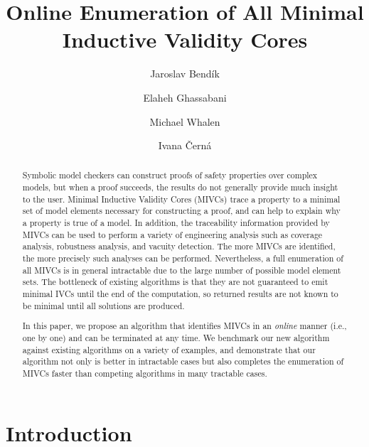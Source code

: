 \documentclass{llncs}
\begin{document}
\title{Online Enumeration of All Minimal Inductive Validity Cores}

\author{Jaroslav Bend\'ik
	\and Elaheh Ghassabani
	\and Michael Whalen
	\and Ivana \v Cern\'a
}



\maketitle
\begin{abstract}
Symbolic model checkers can construct proofs of safety properties over complex models, but when a proof succeeds, the results do not generally provide much insight to the user.  Minimal Inductive Validity Cores (MIVCs) trace a property to a minimal set of model elements necessary for constructing a proof, and can help to explain why a property is true of a model.  In addition, the traceability information provided by MIVCs can be used to perform a variety of engineering analysis such as coverage analysis, robustness analysis, and vacuity detection.  The more MIVCs are identified, the more precisely such analyses can be performed.   Nevertheless, a full enumeration of all MIVCs is in general intractable due to the large number of possible model element sets.  The bottleneck of existing algorithms is that they are not guaranteed to emit minimal IVCs until the end of the computation, so returned results are not known to be minimal until all solutions are produced.

In this paper, we propose an algorithm that identifies MIVCs in an \emph{online} manner (i.e., one by one) and can be terminated at any time.  We benchmark our new algorithm against existing algorithms on a variety of examples, and demonstrate that our algorithm not only is better in intractable cases but also completes the enumeration of MIVCs faster than competing algorithms in many tractable cases.

\end{abstract}



\section{Introduction}
\label{sec:intro}

\end{document}
